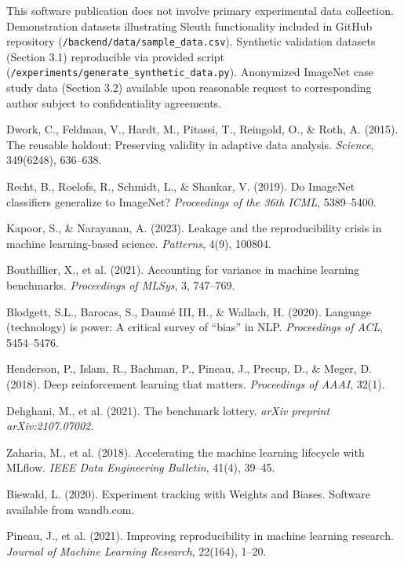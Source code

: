 \documentclass[10pt]{article}
\begin{document}
This software publication does not involve primary experimental data collection. Demonstration datasets illustrating Sleuth functionality included in GitHub repository (\texttt{/backend/data/sample\_data.csv}). Synthetic validation datasets (Section 3.1) reproducible via provided script (\texttt{/experiments/generate\_synthetic\_data.py}). Anonymized ImageNet case study data (Section 3.2) available upon reasonable request to corresponding author subject to confidentiality agreements.

\begin{thebibliography}{99}

Dwork, C., Feldman, V., Hardt, M., Pitassi, T., Reingold, O., \& Roth, A. (2015). The reusable holdout: Preserving validity in adaptive data analysis. \textit{Science}, 349(6248), 636--638.

Recht, B., Roelofs, R., Schmidt, L., \& Shankar, V. (2019). Do ImageNet classifiers generalize to ImageNet? \textit{Proceedings of the 36th ICML}, 5389--5400.

Kapoor, S., \& Narayanan, A. (2023). Leakage and the reproducibility crisis in machine learning-based science. \textit{Patterns}, 4(9), 100804.

Bouthillier, X., et al. (2021). Accounting for variance in machine learning benchmarks. \textit{Proceedings of MLSys}, 3, 747--769.

Blodgett, S.L., Barocas, S., Daumé III, H., \& Wallach, H. (2020). Language (technology) is power: A critical survey of ``bias'' in NLP. \textit{Proceedings of ACL}, 5454--5476.

Henderson, P., Islam, R., Bachman, P., Pineau, J., Precup, D., \& Meger, D. (2018). Deep reinforcement learning that matters. \textit{Proceedings of AAAI}, 32(1).

Dehghani, M., et al. (2021). The benchmark lottery. \textit{arXiv preprint arXiv:2107.07002}.

Zaharia, M., et al. (2018). Accelerating the machine learning lifecycle with MLflow. \textit{IEEE Data Engineering Bulletin}, 41(4), 39--45.

Biewald, L. (2020). Experiment tracking with Weights and Biases. Software available from wandb.com.

Pineau, J., et al. (2021). Improving reproducibility in machine learning research. \textit{Journal of Machine Learning Research}, 22(164), 1--20.


\end{thebibliography}
\end{document}
